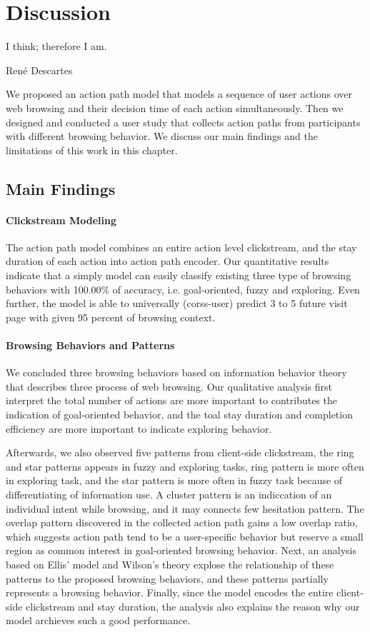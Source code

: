 \section{Discussion}
\label{ch:discuss}

\epigraph{I think; therefore I am.}{Ren\'e Descartes}

We proposed an action path model that models a sequence of user actions over web browsing
and their decision time of each action simultaneously.
Then we designed and conducted a user study that collects action paths
from participants with different browsing behavior.
We discuss our main findings and the limitations of this work in this chapter.

\subsection{Main Findings}

\paragraph{Clickstream Modeling}

The action path model combines an entire action level clickstream, 
and the stay duration of each action into action path encoder.
Our quantitative results indicate that 
a simply model can easily classify existing three type of browsing
behaviors with 100.00\% of accuracy, i.e. goal-oriented, fuzzy and exploring.
Even further, the model is able to universally (corss-user) predict 3 to 5 future visit 
page with given 95 percent of browsing context.

\paragraph{Browsing Behaviors and Patterns}

We concluded three browsing behaviors based on information behavior theory that describes
three process of web browsing.
Our qualitative analysis 
first interpret the total number of actions 
are more important to contributes the indication of goal-oriented behavior,
and the toal stay duration and completion efficiency are more important to indicate exploring behavior.

Afterwards, we also observed five patterns from client-side clickstream, the ring and star patterns
appears in fuzzy and exploring tasks, ring pattern is more often in exploring task,
and the star pattern is more often in fuzzy task because of differentiating of information use.
A cluster pattern is an indiccation of an individual intent while browsing, and it may connects
few hesitation pattern.
The overlap pattern discovered in the collected action path gains a low overlap ratio,
which suggests action path tend to be a user-specific behavior but reserve a small region as
common interest in goal-oriented browsing behavior.
Next, an analysis based on Ellis' model and Wilson's theory explose the relationship 
of these patterns to the proposed browsing behaviors, and these patterns partially represents a browsing behavior.
Finally, since the model encodes the entire client-side clickstream and stay duration,
the analysis also explains the reason why our model archieves such a good performance.

